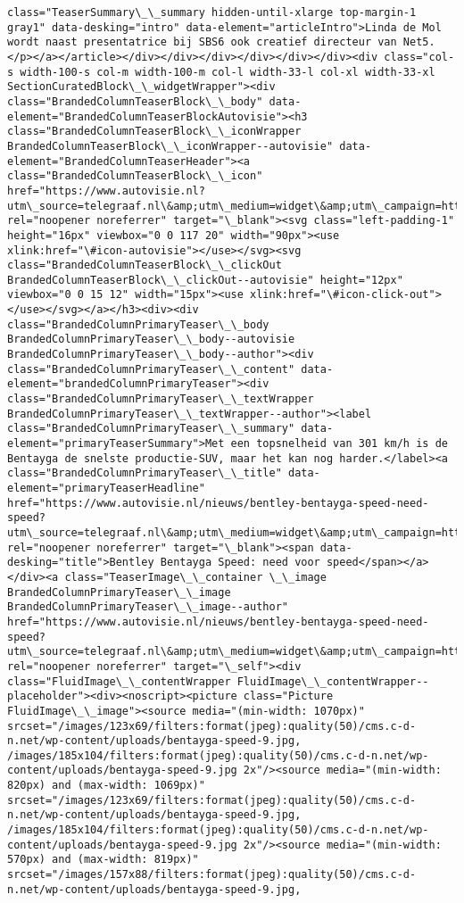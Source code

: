 \documentclass[11pt]{article}
\begin{document}
\begin{Verbatim}[commandchars=\\\{\}]
class="TeaserSummary\_\_summary hidden-until-xlarge top-margin-1 gray1" data-desking="intro" data-element="articleIntro">Linda de Mol wordt naast presentatrice bij SBS6 ook creatief directeur van Net5.</p></a></article></div></div></div></div></div></div><div class="col-s width-100-s col-m width-100-m col-l width-33-l col-xl width-33-xl SectionCuratedBlock\_\_widgetWrapper"><div class="BrandedColumnTeaserBlock\_\_body" data-element="BrandedColumnTeaserBlockAutovisie"><h3 class="BrandedColumnTeaserBlock\_\_iconWrapper BrandedColumnTeaserBlock\_\_iconWrapper--autovisie" data-element="BrandedColumnTeaserHeader"><a class="BrandedColumnTeaserBlock\_\_icon" href="https://www.autovisie.nl?utm\_source=telegraaf.nl\&amp;utm\_medium=widget\&amp;utm\_campaign=https://www.telegraaf.nl/" rel="noopener noreferrer" target="\_blank"><svg class="left-padding-1" height="16px" viewbox="0 0 117 20" width="90px"><use xlink:href="\#icon-autovisie"></use></svg><svg class="BrandedColumnTeaserBlock\_\_clickOut BrandedColumnTeaserBlock\_\_clickOut--autovisie" height="12px" viewbox="0 0 15 12" width="15px"><use xlink:href="\#icon-click-out"></use></svg></a></h3><div><div class="BrandedColumnPrimaryTeaser\_\_body BrandedColumnPrimaryTeaser\_\_body--autovisie BrandedColumnPrimaryTeaser\_\_body--author"><div class="BrandedColumnPrimaryTeaser\_\_content" data-element="brandedColumnPrimaryTeaser"><div class="BrandedColumnPrimaryTeaser\_\_textWrapper BrandedColumnPrimaryTeaser\_\_textWrapper--author"><label class="BrandedColumnPrimaryTeaser\_\_summary" data-element="primaryTeaserSummary">Met een topsnelheid van 301 km/h is de Bentayga de snelste productie-SUV, maar het kan nog harder.</label><a class="BrandedColumnPrimaryTeaser\_\_title" data-element="primaryTeaserHeadline" href="https://www.autovisie.nl/nieuws/bentley-bentayga-speed-need-speed?utm\_source=telegraaf.nl\&amp;utm\_medium=widget\&amp;utm\_campaign=https://www.telegraaf.nl/" rel="noopener noreferrer" target="\_blank"><span data-desking="title">Bentley Bentayga Speed: need voor speed</span></a></div><a class="TeaserImage\_\_container \_\_image BrandedColumnPrimaryTeaser\_\_image BrandedColumnPrimaryTeaser\_\_image--author" href="https://www.autovisie.nl/nieuws/bentley-bentayga-speed-need-speed?utm\_source=telegraaf.nl\&amp;utm\_medium=widget\&amp;utm\_campaign=https://www.telegraaf.nl/" rel="noopener noreferrer" target="\_self"><div class="FluidImage\_\_contentWrapper FluidImage\_\_contentWrapper--placeholder"><div><noscript><picture class="Picture FluidImage\_\_image"><source media="(min-width: 1070px)" srcset="/images/123x69/filters:format(jpeg):quality(50)/cms.c-d-n.net/wp-content/uploads/bentayga-speed-9.jpg, /images/185x104/filters:format(jpeg):quality(50)/cms.c-d-n.net/wp-content/uploads/bentayga-speed-9.jpg 2x"/><source media="(min-width: 820px) and (max-width: 1069px)" srcset="/images/123x69/filters:format(jpeg):quality(50)/cms.c-d-n.net/wp-content/uploads/bentayga-speed-9.jpg, /images/185x104/filters:format(jpeg):quality(50)/cms.c-d-n.net/wp-content/uploads/bentayga-speed-9.jpg 2x"/><source media="(min-width: 570px) and (max-width: 819px)" srcset="/images/157x88/filters:format(jpeg):quality(50)/cms.c-d-n.net/wp-content/uploads/bentayga-speed-9.jpg, 
\end{Verbatim}
\end{document}
